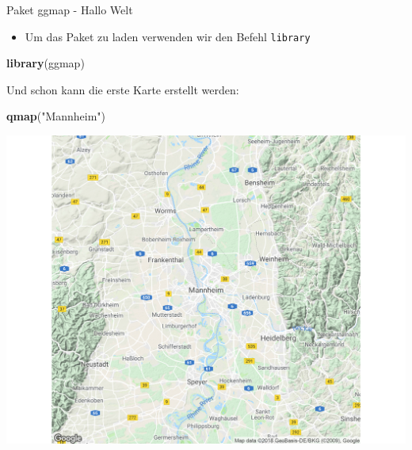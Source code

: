 \documentclass[ignorenonframetext,]{beamer}
\newenvironment{Shaded}{\begin{snugshade}}{\end{snugshade}}
\newcommand{\KeywordTok}[1]{\textcolor[rgb]{0.13,0.29,0.53}{\textbf{#1}}}
\newcommand{\NormalTok}[1]{#1}
\newcommand{\StringTok}[1]{\textcolor[rgb]{0.31,0.60,0.02}{#1}}
\providecommand{\tightlist}{%
  \setlength{\itemsep}{0pt}\setlength{\parskip}{0pt}}
\begin{document}
\begin{frame}[fragile]{Paket ggmap - Hallo Welt}
\protect\hypertarget{paket-ggmap---hallo-welt}{}

\begin{itemize}
\tightlist
\item
  Um das Paket zu laden verwenden wir den Befehl \texttt{library}
\end{itemize}

\begin{Shaded}
\begin{Highlighting}[]
\KeywordTok{library}\NormalTok{(ggmap)}
\end{Highlighting}
\end{Shaded}

Und schon kann die erste Karte erstellt werden:

\begin{Shaded}
\begin{Highlighting}[]
\KeywordTok{qmap}\NormalTok{(}\StringTok{"Mannheim"}\NormalTok{)}
\end{Highlighting}
\end{Shaded}

\includegraphics{figure/Mannheim_ggmap.pdf}

\end{frame}
\end{document}
